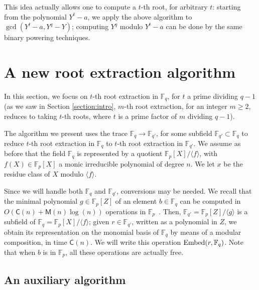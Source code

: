 \documentclass[12pt]{article}
\theoremstyle{plain}
\theoremstyle{definition}
\newcommand{\refsection}[1]{Section \ref{#1}}
\def\F{\mathbb{F}}
\def\M{\mathsf{M}}
\def\CC{\mathsf{C}}
\newcounter{algorithm}
\begin{document}
This idea actually allows one to compute a $t$-th root, for arbitrary
$t$: starting from the polynomial $Y^t-a$, we apply the above
algorithm to $\gcd(Y^t-a, Y^q-Y)$; computing $Y^q$ modulo $Y^t-a$ can
be done by the same binary powering techniques.





\section{A new root extraction algorithm}\label{section:newRootEx}

In this section, we focus on $t$-th root extraction in $\F_q$, for $t$
a prime dividing $q-1$ (as we saw in \refsection{section:intro},
$m$-th root extraction, for an integer $m \ge 2$, reduces to taking 
$t$-th roots, where $t$ is a prime factor of $m$ dividing $q-1$).

The algorithm we present uses the trace $\F_q \to \F_{q'}$, for some
subfield $\F_{q'} \subset \F_q$ to reduce $t$-th root extraction in
$\F_q$ to $t$-th root extraction in $\F_{q'}$. We assume as before
that the field $\F_q$ is represented by a quotient $\F_p[X] / \langle
f\rangle$, with $f(X) \in \F_p[X]$ a monic irreducible polynomial of
degree $n$. We let $x$ be the residue class of $X$ modulo $\langle
f\rangle$.

Since we will handle both $\F_q$ and $\F_{q'}$, conversions may be
needed. We recall that the minimal polynomial $g \in \F_p[Z]$ of an
element $b \in \F_q$ can be computed in $O(\CC(n)+\M(n)\log(n))$
operations in $\F_p$~\cite{Shoup1994}. Then, $\F_{q'}=\F_p[Z]/\langle
g\rangle$ is a subfield of $\F_q=\F_p[X]/\langle f\rangle $; given $r \in
\F_{q'}$, written as a polynomial in $Z$, we obtain its representation
on the monomial basis of $\F_q$ by means of a modular composition, in
time $\CC(n)$. We will write this operation ${\rm Embed}(r,\F_q)$.
Note that when $b$ is in $\F_p$, all these operations are actually
free.



\subsection{An auxiliary algorithm}
\end{document}
